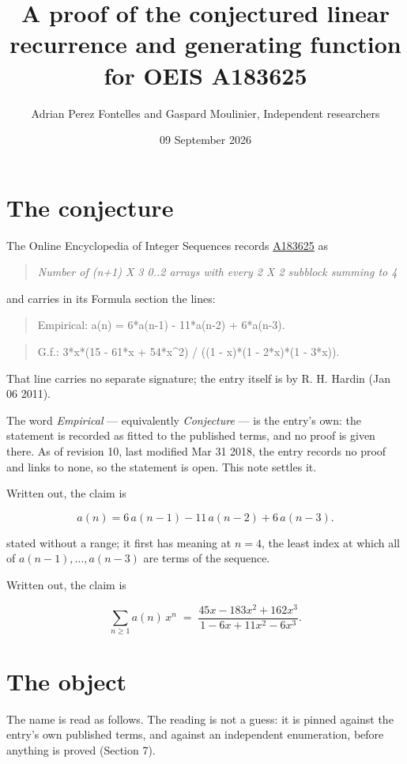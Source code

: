 \documentclass[11pt]{article}
\title{A proof of the conjectured linear recurrence and generating function for OEIS A183625}
\author{Adrian Perez Fontelles and Gaspard Moulinier, Independent researchers}
\date{09 September 2026}
\theoremstyle{definition}
\begin{document}
\maketitle
\section{The conjecture}

The Online Encyclopedia of Integer Sequences records \href{https://oeis.org/A183625}{A183625} as

\begin{quote}\itshape Number of (n+1) X 3 0..2 arrays with every 2 X 2 subblock summing to 4\end{quote}

and carries in its Formula section the lines:

\begin{quote}\ttfamily Empirical: a(n) = 6*a(n-1) - 11*a(n-2) + 6*a(n-3).\end{quote}

\begin{quote}\ttfamily G.f.: 3*x*(15 - 61*x + 54*x\textasciicircum{}2) / ((1 - x)*(1 - 2*x)*(1 - 3*x)).\end{quote}

That line carries no separate signature; the entry itself is by R. H. Hardin (Jan 06 2011).

The word {\itshape Empirical} --- equivalently {\itshape Conjecture} --- is the entry's own: the statement is recorded as fitted to the published terms, and no proof is given there. As of revision 10, last modified Mar 31 2018, the entry records no proof and links to none, so the statement is open. This note settles it.

Written out, the claim is

\[a(n) = 6\,a(n-1) - 11\,a(n-2) + 6\,a(n-3).\]

stated without a range; it first has meaning at $n = 4$, the least index at which all of $a(n-1),\dots,a(n-3)$ are terms of the sequence.

Written out, the claim is

\[\sum_{n \ge 1} a(n)\,x^n \;=\; \frac{45x - 183x^{2} + 162x^{3}}{1 - 6x + 11x^{2} - 6x^{3}}.\]

\section{The object}

The name is read as follows. The reading is not a guess: it is pinned against the entry's own published terms, and against an independent enumeration, before anything is proved (Section 7).
\end{document}

